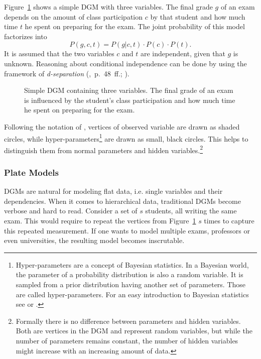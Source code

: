 Figure~\ref{fig:simple_dgm} shows a simple DGM with three variables. The final grade $g$ of an exam depends on the amount of class participation $c$ by that student and how much time $t$ he spent on preparing for the exam. The joint probability of this model factorizes into $$P(g,c,t) = P(g | c, t) \cdot P(c) \cdot P(t).$$ It is assumed that the two variables $c$ and $t$ are independent, given that $g$ is unknown. Reasoning about conditional independence can be done by using the framework of \emph{d-separation}  (\cite{lauritzen1996graphical},~p.~48~ff.; \cite{pearl1988probabilistic}).

\begin{figure}[t]
	\begin{center}
    	\scalebox{\tikzScale}{\adjustTikzSize }
	\end{center}
\caption[Simple directed graphical model containing three variables.]{Simple DGM containing three variables. The final grade of an exam is influenced by the student's class participation and how much time he spent on preparing for the exam.}
		\label{fig:simple_dgm}
\end{figure}

Following the notation of \textcite{bishop2006pattern}, vertices of observed variable are drawn as shaded circles, while hyper-parameters\footnote{Hyper-parameters are a concept of Bayesian statistics. In a Bayesian world, the parameter of a probability distribution is also a random variable. It is sampled from a prior distribution having another set of parameters. Those are called hyper-parameters. For an easy introduction to Bayesian statistics see \textcite{gelman2013bayesian} or \textcite{kruschke2010doing}.} are drawn as small, black circles. This helps to distinguish them from normal parameters and hidden variables.\footnote{Formally there is no difference between parameters and hidden variables. Both are vertices in the DGM and represent random variables, but while the number of parameters remains constant, the number of hidden variables might increase with an increasing amount of data.}

\subsubsection{Plate Models}

DGMs are natural for modeling flat data, i.e. single variables and their dependencies. When it comes to hierarchical data, traditional DGMs become verbose and hard to read. Consider a set of $s$ students, all writing the same exam. This would require to repeat the vertices from Figure~\ref{fig:simple_dgm} $s$ times to capture this repeated measurement. If one wants to model multiple exams, professors or even universities, the resulting model becomes inscrutable.

